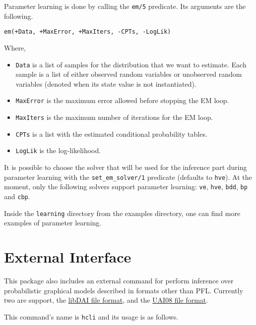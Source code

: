 \documentclass{article}
\begin{document}
Parameter learning is done by calling the \texttt{em/5} predicate. Its arguments are the following.

\texttt{em(+Data, +MaxError, +MaxIters, -CPTs, -LogLik)}

Where,
\begin{itemize}
 \item \texttt{Data} is a list of samples for the distribution that we want to estimate. Each sample is a list of either observed random variables or unobserved random variables (denoted when its state value is not instantiated).
 \item \texttt{MaxError} is the maximum error allowed before stopping the EM loop.
 \item \texttt{MaxIters} is the maximum number of iterations for the EM loop.
 \item \texttt{CPTs} is a list with the estimated conditional probability tables.
 \item \texttt{LogLik} is the log-likelihood.
\end{itemize}


It is possible to choose the solver that will be used for the inference part during parameter learning with the \texttt{set\_em\_solver/1} predicate (defaults to \texttt{hve}). At the moment, only the following solvers support parameter learning: \texttt{ve}, \texttt{hve}, \texttt{bdd}, \texttt{bp} and \texttt{cbp}.

Inside the \texttt{learning} directory from the examples directory, one can find more examples of parameter learning.



\section{External Interface}
This package also includes an external command for perform inference over probabilistic graphical models described in formats other than PFL. Currently two are support, the \href{http://cs.ru.nl/~jorism/libDAI/doc/fileformats.html}{libDAI file format}, and the \href{http://graphmod.ics.uci.edu/uai08/FileFormat}{UAI08 file format}.

This command's name is \texttt{hcli} and its usage is as follows.
\end{document}

